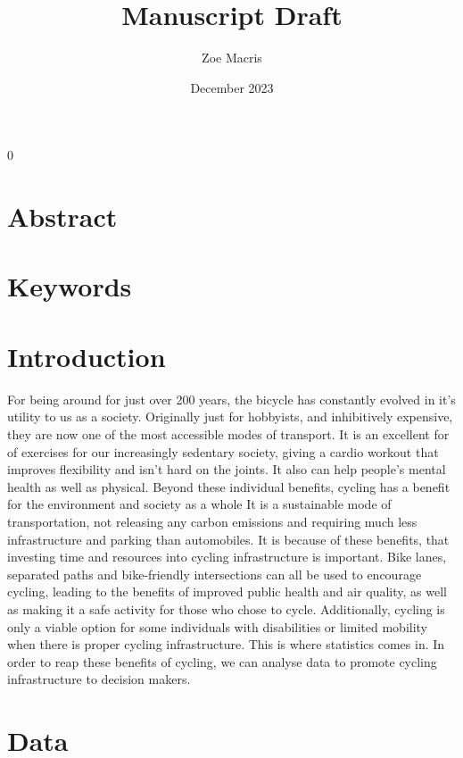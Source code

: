 \documentclass[12pt, letterpaper]{article}
\newcommand{\blind}{0}
\begin{document}
\blind
{
  \title{\bf Manuscript Draft}
  \author{Zoe Macris}
\date{December 2023}
  \maketitle} 


\section{Abstract}
\label{sec:abstract}



\section{Keywords}
\label{sec:keywords}


\section{Introduction}
\label{sec:intro}

For being around for just over 200 years, the bicycle has constantly evolved in it's utility to us as a society. Originally just for hobbyists, and inhibitively expensive, they are now one of the most accessible modes of transport. It is an excellent for of exercises for our increasingly sedentary society, giving a cardio workout that improves flexibility and isn't hard on the joints. It also can help people's mental health as well as physical. Beyond these individual benefits, cycling has a benefit for the environment and society as a whole It is a sustainable mode of transportation, not releasing any carbon emissions and requiring much less infrastructure and parking than automobiles. It is because of these benefits, that investing time and resources into cycling infrastructure is important. Bike lanes, separated paths and bike-friendly intersections can all be used to encourage cycling, leading to the benefits of improved public health and air quality, as well as making it a safe activity for those who chose to cycle. Additionally, cycling is only a viable option for some individuals with disabilities or limited mobility when there is proper cycling infrastructure. This is where statistics comes in. In order to reap these benefits of cycling, we can analyse data to promote cycling infrastructure to decision makers. 


\section{Data}
\label{sec:data}
\end{document}
